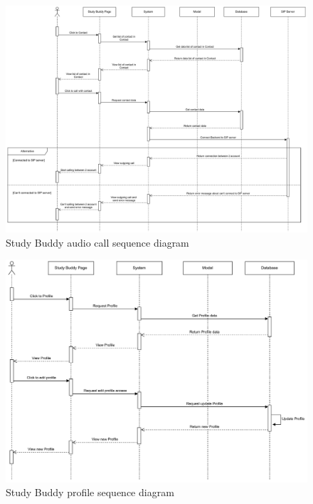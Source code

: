     \begin{figure}[H]
        \centering
        \includegraphics[width=1\textwidth, height=0.5\textheight]{image/StudyBuddySequenceDiagram-Contact.pdf} 
        \caption{Study Buddy audio call sequence diagram}
        \label{fig:studyBuddy_audiocall_sequence}
    \end{figure}

    \begin{figure}[H]
        \centering
        \includegraphics[width=1\textwidth]{image/StudyBuddySequenceDiagram-Profile.pdf} 
        \caption{Study Buddy profile sequence diagram}
        \label{fig:studyBuddy_profile_sequence}
    \end{figure}

